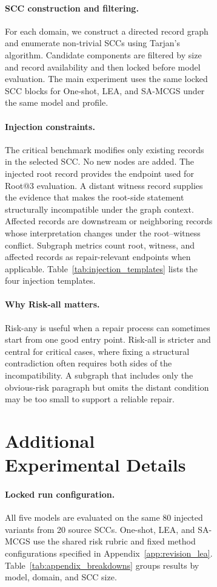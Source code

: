 \documentclass[11pt]{article}
\makeatletter
\newcommand{\samcgs}{SA-MCGS}
\newcommand{\riskany}{Risk-any}
\newcommand{\riskall}{Risk-all}
\newcommand{\rootthree}{Root@3}
\newcommand{\scc}{SCC}
\makeatother
\begin{document}
\begin{figure}[!t]
\begin{figure}[!t]
\paragraph{SCC construction and filtering.}
For each domain, we construct a directed record graph and enumerate non-trivial \scc{}s using Tarjan's algorithm.  Candidate components are filtered by size and record availability and then locked before model evaluation.  The main experiment uses the same locked \scc{} blocks for One-shot, LEA, and \samcgs{} under the same model and profile.



\paragraph{Injection constraints.}
The critical benchmark modifies only existing records in the selected \scc{}.  No new nodes are added.  The injected root record provides the endpoint used for \rootthree{} evaluation.  A distant witness record supplies the evidence that makes the root-side statement structurally incompatible under the graph context.  Affected records are downstream or neighboring records whose interpretation changes under the root--witness conflict.  Subgraph metrics count root, witness, and affected records as repair-relevant endpoints when applicable. Table~\ref{tab:injection_templates} lists the four injection templates.

\paragraph{Why \riskall{} matters.}
\riskany{} is useful when a repair process can sometimes start from one good entry point.  \riskall{} is stricter and central for critical cases, where fixing a structural contradiction often requires both sides of the incompatibility.  A subgraph that includes only the obvious-risk paragraph but omits the distant condition may be too small to support a reliable repair.

\FloatBarrier
\section{Additional Experimental Details}
\label{sec:appendix_experiments}


\paragraph{Locked run configuration.}
All five models are evaluated on the same 80 injected variants from 20 source \scc{}s. One-shot, LEA, and \samcgs{} use the shared risk rubric and fixed method configurations specified in Appendix~\ref{app:revision_lea}. Table~\ref{tab:appendix_breakdowns} groups results by model, domain, and \scc{} size.



\end{figure}
\end{figure}
\end{document}
